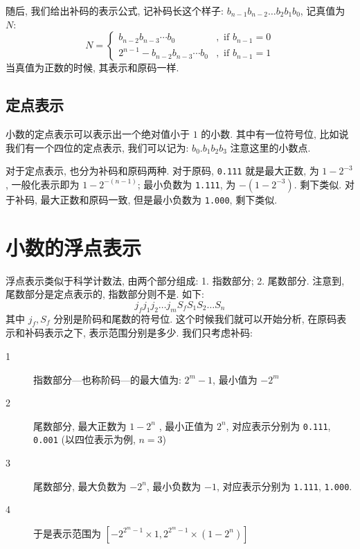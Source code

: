 \documentclass[12pt]{ctexart}
\theoremstyle{definition}
\theoremstyle{plain}
\begin{document}
随后, 我们给出补码的表示公式, 记补码长这个样子: \(b_{n-1}b_{n-2}\dots b_{2}b_{1}b_{0}\), 记真值为 \(N\): 
\begin{equation}
N = 
\begin{cases}
b_{n-2}b_{n-3}\cdots b_{0} &, \text{ if } b_{n-1} = 0\\
2 ^{n-1} - b _{n-2} b_{n-3} \cdots b_{0} &, \text{ if } b_{n-1} = 1
\end{cases}
\end{equation}
当真值为正数的时候, 其表示和原码一样. 
\subsection{定点表示}
小数的定点表示可以表示出一个绝对值小于 \(1\) 的小数. 其中有一位符号位,
比如说我们有一个四位的定点表示, 我们可以记为: \(b_{0}.b_{1}b_{2}b_{3}\) 注意这里的小数点. 

对于定点表示, 也分为补码和原码两种. 对于原码, \texttt{0.111} 就是最大正数, 为 \(1 - 2^{-3}\), 一般化表示即为 \(1- 2^{-(n-1)}\); 最小负数为 \texttt{1.111}, 为 \(- (1- 2 ^{ -3})\). 剩下类似. 对于补码, 最大正数和原码一致, 但是最小负数为 \texttt{1.000}, 剩下类似. 

\section{小数的浮点表示}
浮点表示类似于科学计数法, 由两个部分组成: 1. 指数部分; 2. 尾数部分. 注意到, 尾数部分是定点表示的, 指数部分则不是. 如下:
\begin{equation}
j_{f}j_{1}j_{2}\dots j_{m}S_{f}S_{1}S_{2}\dots S_{n}
\end{equation}
其中 \(j_{f}, S_{f}\) 分别是阶码和尾数的符号位. 这个时候我们就可以开始分析, 在原码表示和补码表示之下, 表示范围分别是多少. 我们只考虑补码:

\begin{description}
\item [1] 指数部分---也称阶码---的最大值为: \(2^{m} -1 \), 最小值为 \(- 2 ^{m}\) 
\item [2] 尾数部分, 最大正数为 \(1-2^{n}\) , 最小正值为 \(2^{n}\), 对应表示分别为 \texttt{0.111}, \texttt{0.001} (以四位表示为例, \(n=3\))
\item [3] 尾数部分, 最大负数为 \(-2 ^{n}\), 最小负数为 \(-1\), 对应表示分别为 \texttt{1.111}, \texttt{1.000}.
\item [4] 于是表示范围为 \( [- 2 ^{2^{m}- 1} \times 1 , 2 ^{2^{m} -1} \times (1 - 2 ^{n} )]\)
\end{description}
\end{document}
